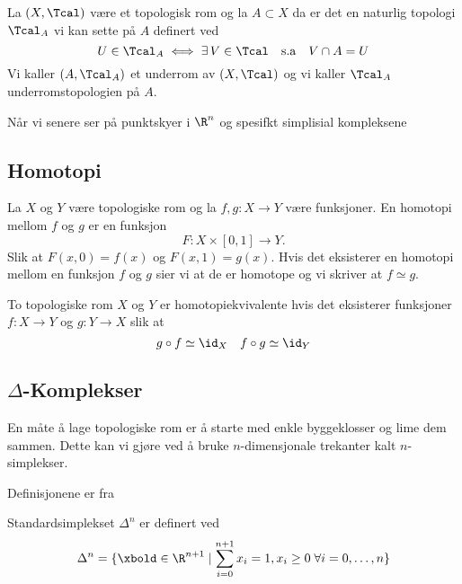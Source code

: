 \begin{definition}\label{Def:label}
    La $(X,\Tcal)$ være et topologisk rom og la $A\subset X$ da er det en naturlig topologi $\Tcal_A$ vi kan sette på $A$ definert ved
    \[U\in\Tcal_A \iff \exists\, V\in\Tcal\quad\text{s.a}\quad V\cap A = U\]
    Vi kaller $(A,\Tcal_A)$ et underrom av $(X,\Tcal)$ og vi kaller $\Tcal_A$ underromstopologien på $A$.
\end{definition}

Når vi senere ser på punktskyer i $\R^n$ og spesifkt simplisial kompleksene %

\subsection{Homotopi}\label{sec:Homotopi}
\begin{definition}\label{Def:Homotopi}
    La $X$ og $Y$ være topologiske rom og la $f,g: X\to Y$ være funksjoner. En homotopi mellom $f$ og $g$ er en funksjon
    \[F: X\times[0,1]\to Y.\]
    Slik at $F(x,0)=f(x)$ og $F(x,1)=g(x)$.
    Hvis det eksisterer en homotopi mellom en funksjon $f$ og $g$ sier vi at de er homotope og vi skriver at $f\simeq g$.
\end{definition}

\begin{definition}\label{Def:HomotopiEkv}
    To topologiske rom $X$ og $Y$ er homotopiekvivalente hvis det eksisterer funksjoner $f: X\to Y$ og $g: Y\to X$ slik at
    \[g\circ f\simeq\id_X\quad f\circ g \simeq \id_Y\]
\end{definition}



\subsection{$\Delta$-Komplekser}\label{sec:SimpKomp}
En måte å lage topologiske rom er å starte med enkle byggeklosser og lime dem sammen. Dette kan vi gjøre ved å bruke $n$-dimensjonale trekanter kalt $n$-simplekser.

Definisjonene er fra \cite{Hatcher2002}

\begin{definition}\label{Def:StndrdSimpKomp}
    Standardsimplekset $\Delta^n$ er definert ved
    \[\Delta^n = \{ \xbold\in\R^{n + 1} \mid \sum_{i = 0}^{n + 1}x_i=1, x_i\geq 0\;\forall i=0,\dots,n\}\]
\end{definition}

